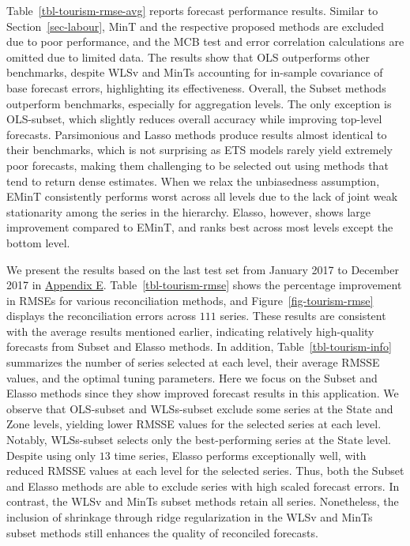\documentclass[
  11pt]{article}
\theoremstyle{plain}
\theoremstyle{remark}
\begin{document}
Table~\ref{tbl-tourism-rmse-avg} reports forecast performance results.
Similar to Section~\ref{sec-labour}, MinT and the respective proposed
methods are excluded due to poor performance, and the MCB test and error
correlation calculations are omitted due to limited data. The results
show that OLS outperforms other benchmarks, despite WLSv and MinTs
accounting for in-sample covariance of base forecast errors,
highlighting its effectiveness. Overall, the Subset methods outperform
benchmarks, especially for aggregation levels. The only exception is
OLS-subset, which slightly reduces overall accuracy while improving
top-level forecasts. Parsimonious and Lasso methods produce results
almost identical to their benchmarks, which is not surprising as ETS
models rarely yield extremely poor forecasts, making them challenging to
be selected out using methods that tend to return dense estimates. When
we relax the unbiasedness assumption, EMinT consistently performs worst
across all levels due to the lack of joint weak stationarity among the
series in the hierarchy. Elasso, however, shows large improvement
compared to EMinT, and ranks best across most levels except the bottom
level.

We present the results based on the last test set from January 2017 to
December 2017 in \hyperref[appendix-tourism]{Appendix E}.
Table~\ref{tbl-tourism-rmse} shows the percentage improvement in RMSEs
for various reconciliation methods, and Figure~\ref{fig-tourism-rmse}
displays the reconciliation errors across \(111\)
series.
These results are consistent with the average results mentioned earlier,
indicating relatively high-quality forecasts from Subset and Elasso
methods. In addition, Table~\ref{tbl-tourism-info} summarizes the number
of series selected at each level, their average RMSSE values, and the
optimal tuning parameters. Here we focus on the Subset and Elasso
methods since they show improved forecast results in this application.
We observe that OLS-subset and WLSs-subset exclude some series at the
State and Zone levels, yielding lower RMSSE values for the selected
series at each level. Notably, WLSs-subset selects only the
best-performing series at the State level. Despite using only \(13\)
time series, Elasso performs exceptionally well, with reduced RMSSE
values at each level for the selected series. Thus, both the Subset and
Elasso methods are able to exclude series with high scaled forecast
errors.
In contrast, the WLSv and MinTs subset methods retain all series.
Nonetheless, the inclusion of shrinkage through ridge regularization in
the WLSv and MinTs subset methods still enhances the quality of
reconciled forecasts.
\end{document}

